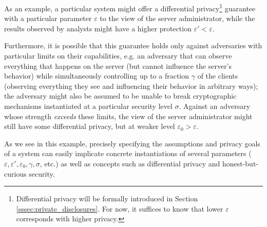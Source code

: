 \documentclass[11pt]{article}
\begin{document}
As an example, a particular system might offer a differential privacy\footnote{Differential privacy will be formally introduced in Section \ref{sssec:private_disclosures}.  For now, it suffices to know that lower $\varepsilon$ corresponds with higher privacy.} guarantee with a particular parameter $\varepsilon$ to the view of the server administrator, while the results observed by analysts might have a higher protection $\varepsilon' < \varepsilon$. 

Furthermore, it is possible that this guarantee holds only against adversaries with particular limits on their capabilities, e.g. an adversary that can observe everything that happens on the server (but cannot influence the server's behavior) while simultaneously controlling up to a fraction $\gamma$ of the clients (observing everything they see and influencing their behavior in arbitrary ways); the adversary might also be assumed to be unable to break cryptographic mechanisms instantiated at a particular security level $\sigma$.  Against an adversary whose strength \textit{exceeds} these limits, the view of the server administrator might still have some differential privacy, but at weaker level $\varepsilon_0 > \varepsilon$.  

As we see in this example, precisely specifying the assumptions and privacy goals of a system can easily implicate concrete instantiations of several parameters ($\varepsilon, \varepsilon', \varepsilon_0, \gamma, \sigma$, etc.) as well as concepts such as differential privacy and honest-but-curious security.
\end{document}
